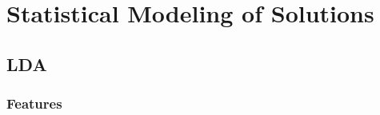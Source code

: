 \chapter{Statistical Modeling of Solutions}\label{chapter:bayesian}







\section{LDA}


\subsection{Features} 


















